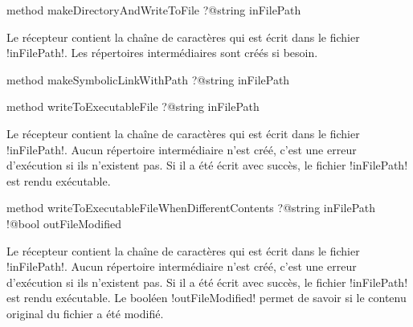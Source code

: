
\begin{galgasbox}
method makeDirectoryAndWriteToFile ?@string inFilePath
\end{galgasbox}

Le récepteur contient la chaîne de caractères qui est écrit dans le fichier \ggs!inFilePath!. Les répertoires intermédiaires sont créés si besoin.









\begin{galgasbox}
method makeSymbolicLinkWithPath ?@string inFilePath
\end{galgasbox}









\begin{galgasbox}
method writeToExecutableFile ?@string inFilePath
\end{galgasbox}

Le récepteur contient la chaîne de caractères qui est écrit dans le fichier \ggs!inFilePath!. Aucun répertoire intermédiaire n'est créé, c'est une erreur d'exécution si ils n'existent pas. Si il a été écrit avec succès, le fichier \ggs!inFilePath! est rendu exécutable.










\begin{galgasbox}
method writeToExecutableFileWhenDifferentContents
    ?@string inFilePath
    !@bool outFileModified
\end{galgasbox}

Le récepteur contient la chaîne de caractères qui est écrit dans le fichier \ggs!inFilePath!. Aucun répertoire intermédiaire n'est créé, c'est une erreur d'exécution si ils n'existent pas. Si il a été écrit avec succès, le fichier \ggs!inFilePath! est rendu exécutable. Le booléen \ggs!outFileModified! permet de savoir si le contenu original du fichier a été modifié.









